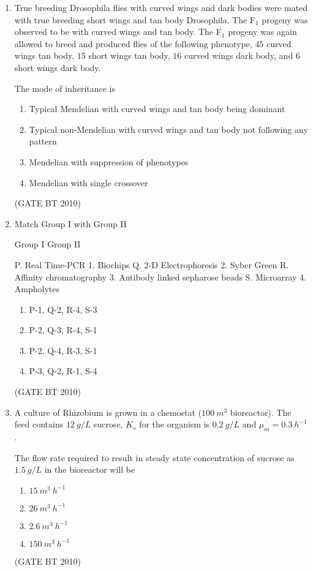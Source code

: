 \documentclass[journal,12pt,onecolumn]{IEEEtran}
\theoremstyle{remark}
\begin{document}
\begin{enumerate}
\item True breeding Drosophila flies with curved wings and dark bodies were mated with true breeding short wings and tan body Drosophila. The F$_1$ progeny was observed to be with curved wings and tan body. The F$_1$ progeny was again allowed to breed and produced flies of the following phenotype, $45$ curved wings tan body, $15$ short wings tan body, $16$ curved wings dark body, and $6$ short wings dark body.

The mode of inheritance is
\begin{enumerate}
   \item Typical Mendelian with curved wings and tan body being dominant
   \item Typical non-Mendelian with curved wings and tan body not following any pattern
   \item Mendelian with suppression of phenotypes
   \item Mendelian with single crossover
\end{enumerate}
\hfill (GATE BT 2010)

\item Match Group I with Group II

Group I \hspace{3cm} Group II

P. Real Time-PCR \hspace{3.2cm} 1. Biochips
Q. 2-D Electrophoresis \hspace{2.4cm} 2. Syber Green
R. Affinity chromatography \hspace{2.2cm} 3. Antibody linked sepharose beads
S. Microarray \hspace{3.6cm} 4. Ampholytes

\begin{enumerate}
   \item P-1, Q-2, R-4, S-3
   \item P-2, Q-3, R-4, S-1
   \item P-2, Q-4, R-3, S-1
   \item P-3, Q-2, R-1, S-4
\end{enumerate}
\hfill (GATE BT 2010)

\item A culture of Rhizobium is grown in a chemostat ($100\ m^{3}$ bioreactor). The feed contains $12\ g/L$ sucrose, $K_{s}$ for the organism is $0.2\ g/L$ and $\mu_{m}=0.3\ h^{-1}$.

The flow rate required to result in steady state concentration of sucrose as $1.5\ g/L$ in the bioreactor will be
\begin{enumerate}
   \item $15\ m^{3}\ h^{-1}$
   \item $26\ m^{3}\ h^{-1}$
   \item $2.6\ m^{3}\ h^{-1}$
   \item $150\ m^{3}\ h^{-1}$
\end{enumerate}
\hfill (GATE BT 2010)


\end{enumerate}
\end{document}
